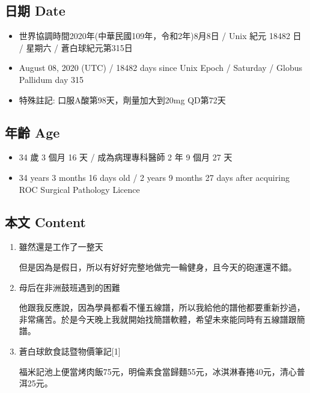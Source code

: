 \documentclass[
]{article}
\providecommand{\tightlist}{%
  \setlength{\itemsep}{0pt}\setlength{\parskip}{0pt}}
\begin{document}
\hypertarget{ux65e5ux671f-date-7}{%
\subsection{日期 Date}\label{ux65e5ux671f-date-7}}

\begin{itemize}
\tightlist
\item
  世界協調時間2020年(中華民國109年，令和2年)8月8日 / Unix 紀元 18482 日
  / 星期六 / 蒼白球紀元第315日
\item
  August 08, 2020 (UTC) / 18482 days since Unix Epoch / Saturday /
  Globus Pallidum day 315
\item
  特殊註記: 口服A酸第98天，劑量加大到20mg QD第72天
\end{itemize}

\hypertarget{ux5e74ux9f61-age-7}{%
\subsection{年齡 Age}\label{ux5e74ux9f61-age-7}}

\begin{itemize}
\tightlist
\item
  34 歲 3 個月 16 天 / 成為病理專科醫師 2 年 9 個月 27 天
\item
  34 years 3 months 16 days old / 2 years 9 months 27 days after
  acquiring ROC Surgical Pathology Licence
\end{itemize}

\hypertarget{ux672cux6587-content-7}{%
\subsection{本文 Content}\label{ux672cux6587-content-7}}

\begin{enumerate}
\def\labelenumi{\arabic{enumi}.}
\item
  雖然還是工作了一整天

  但是因為是假日，所以有好好完整地做完一輪健身，且今天的砲運還不錯。
\item
  母后在非洲鼓班遇到的困難

  他跟我反應說，因為學員都看不懂五線譜，所以我給他的譜他都要重新抄過，非常痛苦。於是今天晚上我就開始找簡譜軟體，希望未來能同時有五線譜跟簡譜。
\item
  蒼白球飲食誌暨物價筆記{[}1{]}

  福米記池上便當烤肉飯75元，明倫素食當歸麵55元，冰淇淋春捲40元，清心普洱25元。
\end{enumerate}
\end{document}
